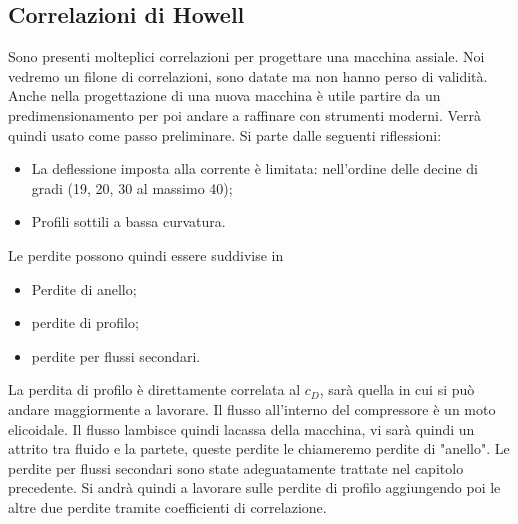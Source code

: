 \subsection{Correlazioni di Howell}
Sono presenti molteplici correlazioni per progettare una macchina assiale. Noi vedremo un filone di correlazioni, sono datate ma non hanno perso di validità. Anche nella progettazione di una nuova macchina è utile partire da un predimensionamento per poi andare a raffinare con strumenti moderni. Verrà quindi usato come passo preliminare.
Si parte dalle seguenti riflessioni:
\begin{itemize}
\item La deflessione imposta alla corrente è limitata: nell'ordine delle decine di gradi (19, 20, 30 al massimo 40);
\item Profili sottili a bassa curvatura.
\end{itemize}
Le perdite possono quindi essere suddivise in 
\begin{itemize}
\item Perdite di anello;
\item perdite di profilo;
\item perdite per flussi secondari.
\end{itemize}
La perdita di profilo è direttamente correlata al $c_D$, sarà quella in cui si può andare maggiormente a lavorare. 
Il flusso all'interno del compressore è un moto elicoidale. Il flusso lambisce quindi lacassa della macchina, vi sarà quindi un attrito tra fluido e la partete, queste perdite le chiameremo perdite di "anello".
Le perdite per flussi secondari sono state adeguatamente trattate nel capitolo precedente. 
Si andrà quindi a lavorare sulle perdite di profilo aggiungendo poi le altre due perdite tramite coefficienti di correlazione.

